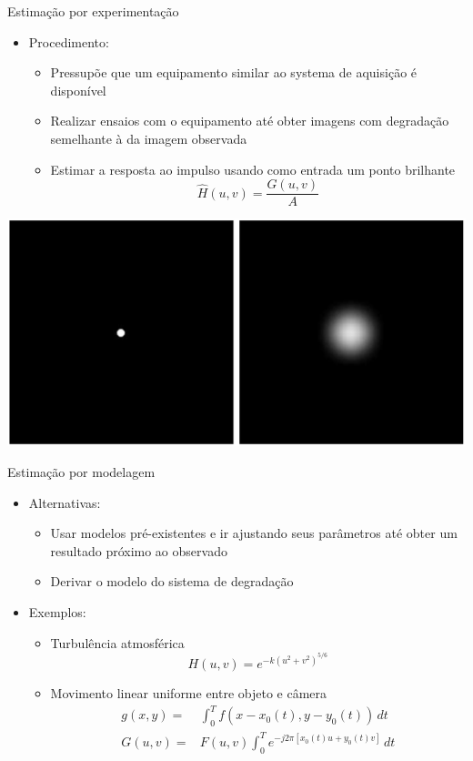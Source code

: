 \begin{slide}{Estimação por experimentação}
	\begin{itemize}
		\item Procedimento:
			\begin{itemize}
				\item Pressupõe que um equipamento similar ao systema de aquisição é disponível
				\item Realizar ensaios com o equipamento até obter imagens com degradação semelhante à da imagem observada
				\item Estimar a resposta ao impulso usando como entrada um ponto brilhante
					\begin{equation*}
						\hat H(u,v) = \frac{G(u,v)}{A}
					\end{equation*}
			\end{itemize}
	\end{itemize}
	\begin{center}
		\includegraphics[height = 0.3\textheight]{figs/5-24}
	\end{center}
\end{slide}

\begin{slide}{Estimação por modelagem}
	\begin{itemize}
		\item Alternativas:
			\begin{itemize}
				\item Usar modelos pré-existentes e ir ajustando seus parâmetros até obter um resultado próximo ao observado 
				\item Derivar o modelo do sistema de degradação
			\end{itemize}
		\item Exemplos:
			\begin{itemize}
				\item Turbulência atmosférica
					\begin{equation*}
						H(u,v) = e^{-k(u^2+v^2)^{5/6}}
					\end{equation*}
				\item Movimento linear uniforme entre objeto e câmera
					\begin{align*}
						g(x,y) =& \int_0^T f( x - x_0( t ), y - y_0( t ))\,dt\\
						G(u,v) =& F(u,v) \int_0^T e^{-j2\pi [ x_0 ( t ) u + y_0( t ) v ] }\,dt
					\end{align*}
			\end{itemize}
	\end{itemize}
\end{slide}

